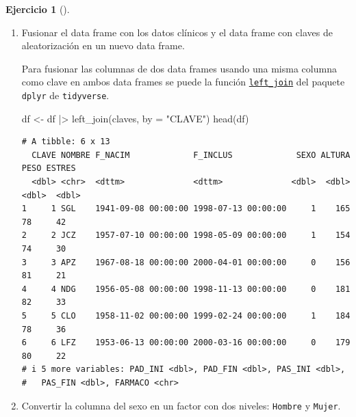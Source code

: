 \documentclass[
  spanish,
  a4paper,
]{scrreport}
\newenvironment{Shaded}{\begin{snugshade}}{\end{snugshade}}
\newcommand{\AttributeTok}[1]{\textcolor[rgb]{0.40,0.45,0.13}{#1}}
\newcommand{\FunctionTok}[1]{\textcolor[rgb]{0.28,0.35,0.67}{#1}}
\newcommand{\NormalTok}[1]{\textcolor[rgb]{0.00,0.23,0.31}{#1}}
\newcommand{\OtherTok}[1]{\textcolor[rgb]{0.00,0.23,0.31}{#1}}
\newcommand{\SpecialCharTok}[1]{\textcolor[rgb]{0.37,0.37,0.37}{#1}}
\newcommand{\StringTok}[1]{\textcolor[rgb]{0.13,0.47,0.30}{#1}}
\theoremstyle{definition}
\newtheorem{exercise}{Ejercicio}[chapter]
\theoremstyle{remark}
\begin{document}
\begin{exercise}[]
\begin{enumerate}
\begin{tcolorbox}
  \end{tcolorbox}
\item
  Fusionar el data frame con los datos clínicos y el data frame con
  claves de aleatorización en un nuevo data frame.

  \begin{tcolorbox}[enhanced jigsaw, titlerule=0mm, arc=.35mm, rightrule=.15mm, opacitybacktitle=0.6, leftrule=.75mm, colframe=quarto-callout-tip-color-frame, toptitle=1mm, breakable, colbacktitle=quarto-callout-tip-color!10!white, bottomrule=.15mm, colback=white, left=2mm, bottomtitle=1mm, opacityback=0, title=\textcolor{quarto-callout-tip-color}{\faLightbulb}\hspace{0.5em}{Solución}, toprule=.15mm, coltitle=black]

  Para fusionar las columnas de dos data frames usando una misma columna
  como clave en ambos data frames se puede la función
  \href{https://dtplyr.tidyverse.org/reference/left_join.dtplyr_step.html}{\texttt{left\_join}}
  del paquete \texttt{dplyr} de \texttt{tidyverse}.

\begin{Shaded}
\begin{Highlighting}[]
\NormalTok{df }\OtherTok{\textless{}{-}}\NormalTok{ df }\SpecialCharTok{|\textgreater{}} \FunctionTok{left\_join}\NormalTok{(claves, }\AttributeTok{by =} \StringTok{"CLAVE"}\NormalTok{)}
\FunctionTok{head}\NormalTok{(df)}
\end{Highlighting}
\end{Shaded}

\begin{verbatim}
# A tibble: 6 x 13
  CLAVE NOMBRE F_NACIM             F_INCLUS             SEXO ALTURA  PESO ESTRES
  <dbl> <chr>  <dttm>              <dttm>              <dbl>  <dbl> <dbl>  <dbl>
1     1 SGL    1941-09-08 00:00:00 1998-07-13 00:00:00     1    165    78     42
2     2 JCZ    1957-07-10 00:00:00 1998-05-09 00:00:00     1    154    74     30
3     3 APZ    1967-08-18 00:00:00 2000-04-01 00:00:00     0    156    81     21
4     4 NDG    1956-05-08 00:00:00 1998-11-13 00:00:00     0    181    82     33
5     5 CLO    1958-11-02 00:00:00 1999-02-24 00:00:00     1    184    78     36
6     6 LFZ    1953-06-13 00:00:00 2000-03-16 00:00:00     0    179    80     22
# i 5 more variables: PAD_INI <dbl>, PAD_FIN <dbl>, PAS_INI <dbl>,
#   PAS_FIN <dbl>, FARMACO <chr>
\end{verbatim}

  \end{tcolorbox}
\item
  Convertir la columna del sexo en un factor con dos niveles:
  \texttt{Hombre} y \texttt{Mujer}.


\end{enumerate}
\end{exercise}
\end{document}
